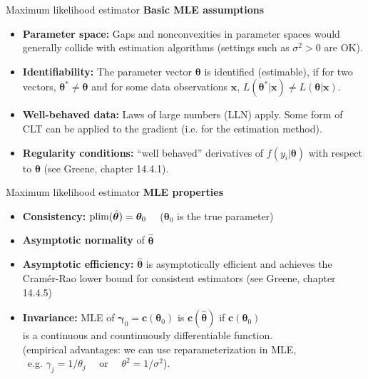 \documentclass{beamer}
\begin{document}
\begin{frame}{Maximum likelihood estimator}
\textbf{Basic MLE assumptions}\\
\begin{itemize}
    \item \textbf{Parameter space:} Gaps and nonconvexities in parameter spaces would generally collide with estimation algorithms (settings such as $\sigma^2 > 0$ are OK).
    \item \textbf{Identifiability:} The parameter vector $\bm{\theta}$ is identified (estimable), if for two vectors, $\bm{\theta}^{*} \neq \bm{\theta}$ and for some data observations $\bm{x}$, $L(\bm{\theta}^{*}|\bm{x}) \neq L(\bm{\theta}|\bm{x})$.
    \item \textbf{Well-behaved data:} Laws of large numbers (LLN) apply. Some form of CLT can be applied to the gradient (i.e. for the estimation method).
    \item \textbf{Regularity conditions:} ``well behaved'' derivatives of $f(y_i|\bm{\theta})$ with respect to $\bm{\theta}$ (see Greene, chapter 14.4.1).
\end{itemize}
\end{frame}
\begin{frame}{Maximum likelihood estimator}
\textbf{MLE properties}\\
\begin{itemize}
    \item \textbf{Consistency:} $\textnormal{plim}(\hat{\bm{\theta}}) = \bm{\theta}_0$ ~~($\bm{\theta}_0$ is the true parameter)
    \medskip
    \item \textbf{Asymptotic normality} of $\bm{\hat{\theta}}$
    \medskip
    \item \textbf{Asymptotic efficiency:}  $\bm{\hat{\theta}}$ is asymptotically efficient and achieves the Cramér-Rao lower bound for consistent estimators (see Greene, chapter 14.4.5)
    \medskip
    \item \textbf{Invariance:} MLE of $\bm{\gamma}_0=\bm{c}(\bm{\theta}_0)$ is $\bm{c}(\bm{\hat{\theta}})$ if $\bm{c}(\bm{\theta}_0)$ \\is a continuous and countinuously differentiable function.\\ \smallskip \footnotesize{ 
    (empirical advantages: we can use reparameterization in MLE, \\~e.g. $\gamma_j = 1/\theta_j$ ~~or~~ $\theta^2 = 1/\sigma^2$).}
\end{itemize}
\end{frame}
\end{document}
